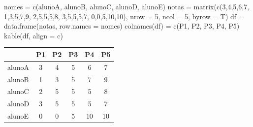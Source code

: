 \documentclass[
]{book}
\newenvironment{Shaded}{\begin{snugshade}}{\end{snugshade}}
\newcommand{\AttributeTok}[1]{\textcolor[rgb]{0.77,0.63,0.00}{#1}}
\newcommand{\DecValTok}[1]{\textcolor[rgb]{0.00,0.00,0.81}{#1}}
\newcommand{\FunctionTok}[1]{\textcolor[rgb]{0.00,0.00,0.00}{#1}}
\newcommand{\NormalTok}[1]{#1}
\newcommand{\OtherTok}[1]{\textcolor[rgb]{0.56,0.35,0.01}{#1}}
\newcommand{\StringTok}[1]{\textcolor[rgb]{0.31,0.60,0.02}{#1}}
\begin{document}
\begin{Shaded}
\begin{Highlighting}[]
\NormalTok{nomes }\OtherTok{=} \FunctionTok{c}\NormalTok{(}\StringTok{\textquotesingle{}alunoA\textquotesingle{}}\NormalTok{, }\StringTok{\textquotesingle{}alunoB\textquotesingle{}}\NormalTok{, }\StringTok{\textquotesingle{}alunoC\textquotesingle{}}\NormalTok{,}
          \StringTok{\textquotesingle{}alunoD\textquotesingle{}}\NormalTok{, }\StringTok{\textquotesingle{}alunoE\textquotesingle{}}\NormalTok{)}
\NormalTok{notas }\OtherTok{=} \FunctionTok{matrix}\NormalTok{(}\FunctionTok{c}\NormalTok{(}\DecValTok{3}\NormalTok{,}\DecValTok{4}\NormalTok{,}\DecValTok{5}\NormalTok{,}\DecValTok{6}\NormalTok{,}\DecValTok{7}\NormalTok{,}
               \DecValTok{1}\NormalTok{,}\DecValTok{3}\NormalTok{,}\DecValTok{5}\NormalTok{,}\DecValTok{7}\NormalTok{,}\DecValTok{9}\NormalTok{,}
               \DecValTok{2}\NormalTok{,}\DecValTok{5}\NormalTok{,}\DecValTok{5}\NormalTok{,}\DecValTok{5}\NormalTok{,}\DecValTok{8}\NormalTok{,}
               \DecValTok{3}\NormalTok{,}\DecValTok{5}\NormalTok{,}\DecValTok{5}\NormalTok{,}\DecValTok{5}\NormalTok{,}\DecValTok{7}\NormalTok{,}
               \DecValTok{0}\NormalTok{,}\DecValTok{0}\NormalTok{,}\DecValTok{5}\NormalTok{,}\DecValTok{10}\NormalTok{,}\DecValTok{10}\NormalTok{), }\AttributeTok{nrow =} \DecValTok{5}\NormalTok{, }\AttributeTok{ncol =} \DecValTok{5}\NormalTok{, }\AttributeTok{byrow =}\NormalTok{ T)}
\NormalTok{df }\OtherTok{=} \FunctionTok{data.frame}\NormalTok{(notas, }\AttributeTok{row.names =}\NormalTok{ nomes)}
\FunctionTok{colnames}\NormalTok{(df) }\OtherTok{=} \FunctionTok{c}\NormalTok{(}\StringTok{\textquotesingle{}P1\textquotesingle{}}\NormalTok{, }\StringTok{\textquotesingle{}P2\textquotesingle{}}\NormalTok{, }\StringTok{\textquotesingle{}P3\textquotesingle{}}\NormalTok{, }\StringTok{\textquotesingle{}P4\textquotesingle{}}\NormalTok{, }\StringTok{\textquotesingle{}P5\textquotesingle{}}\NormalTok{)}
\FunctionTok{kable}\NormalTok{(df, }\AttributeTok{align =} \StringTok{\textquotesingle{}c\textquotesingle{}}\NormalTok{)}
\end{Highlighting}
\end{Shaded}

\begin{tabular}{l|c|c|c|c|c}
\hline
  & P1 & P2 & P3 & P4 & P5\\
\hline
alunoA & 3 & 4 & 5 & 6 & 7\\
\hline
alunoB & 1 & 3 & 5 & 7 & 9\\
\hline
alunoC & 2 & 5 & 5 & 5 & 8\\
\hline
alunoD & 3 & 5 & 5 & 5 & 7\\
\hline
alunoE & 0 & 0 & 5 & 10 & 10\\
\hline
\end{tabular}
\end{document}
